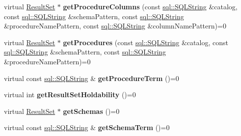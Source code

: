 \begin{DoxyCompactItemize}
\item 
\hypertarget{classsql_1_1_database_meta_data_acc5d42453f7ab2e1314b97e29051cd2e}{}\label{classsql_1_1_database_meta_data_acc5d42453f7ab2e1314b97e29051cd2e} 
virtual \hyperlink{classsql_1_1_result_set}{Result\+Set} $\ast$ {\bfseries get\+Procedure\+Columns} (const \hyperlink{classsql_1_1_s_q_l_string}{sql\+::\+S\+Q\+L\+String} \&catalog, const \hyperlink{classsql_1_1_s_q_l_string}{sql\+::\+S\+Q\+L\+String} \&schema\+Pattern, const \hyperlink{classsql_1_1_s_q_l_string}{sql\+::\+S\+Q\+L\+String} \&procedure\+Name\+Pattern, const \hyperlink{classsql_1_1_s_q_l_string}{sql\+::\+S\+Q\+L\+String} \&column\+Name\+Pattern)=0
\item 
\hypertarget{classsql_1_1_database_meta_data_ac27e60d74934641fe7fcbefae4842835}{}\label{classsql_1_1_database_meta_data_ac27e60d74934641fe7fcbefae4842835} 
virtual \hyperlink{classsql_1_1_result_set}{Result\+Set} $\ast$ {\bfseries get\+Procedures} (const \hyperlink{classsql_1_1_s_q_l_string}{sql\+::\+S\+Q\+L\+String} \&catalog, const \hyperlink{classsql_1_1_s_q_l_string}{sql\+::\+S\+Q\+L\+String} \&schema\+Pattern, const \hyperlink{classsql_1_1_s_q_l_string}{sql\+::\+S\+Q\+L\+String} \&procedure\+Name\+Pattern)=0
\item 
\hypertarget{classsql_1_1_database_meta_data_a64ffac3e5ce785a9f530b6debf79e8dc}{}\label{classsql_1_1_database_meta_data_a64ffac3e5ce785a9f530b6debf79e8dc} 
virtual const \hyperlink{classsql_1_1_s_q_l_string}{sql\+::\+S\+Q\+L\+String} \& {\bfseries get\+Procedure\+Term} ()=0
\item 
\hypertarget{classsql_1_1_database_meta_data_aa99ad098ea64c9aaf216688bc9bbe2b7}{}\label{classsql_1_1_database_meta_data_aa99ad098ea64c9aaf216688bc9bbe2b7} 
virtual int {\bfseries get\+Result\+Set\+Holdability} ()=0
\item 
\hypertarget{classsql_1_1_database_meta_data_aa84ae70b639eb3584b7fa110b4cb4e11}{}\label{classsql_1_1_database_meta_data_aa84ae70b639eb3584b7fa110b4cb4e11} 
virtual \hyperlink{classsql_1_1_result_set}{Result\+Set} $\ast$ {\bfseries get\+Schemas} ()=0
\item 
\hypertarget{classsql_1_1_database_meta_data_ae84cd0fe174b1ee8c10c3088772f0a43}{}\label{classsql_1_1_database_meta_data_ae84cd0fe174b1ee8c10c3088772f0a43} 
virtual const \hyperlink{classsql_1_1_s_q_l_string}{sql\+::\+S\+Q\+L\+String} \& {\bfseries get\+Schema\+Term} ()=0
\item 
\hypertarget{classsql_1_1_database_meta_data_a1db2eebd3ecf4afeab01f8c4079d9e6d}{}\label{classsql_1_1_database_meta_data_a1db2eebd3ecf4afeab01f8c4079d9e6d} 

\end{DoxyCompactItemize}
